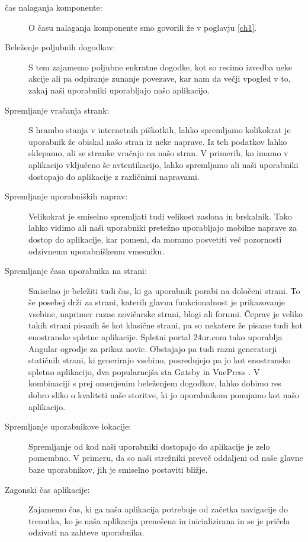 \documentclass[a4paper, 12pt]{book}
\begin{document}
\begin{description}
	\item[čas nalaganja komponente:] O času nalaganja komponente smo govorili že v poglavju \ref{ch1}.
	\item[Beleženje poljubnih dogodkov:] S tem zajamemo poljubne enkratne dogodke, kot so recimo izvedba neke akcije ali pa odpiranje zunanje povezave, kar nam da večji vpogled v to, zakaj naši uporabniki uporabljajo našo aplikacijo.
	\item[Spremljanje vračanja strank:] S hrambo stanja v internetnih piškotkih, lahko spremljamo kolikokrat je uporabnik že obiskal našo stran iz neke naprave. Iz teh podatkov lahko sklepamo,  ali se stranke vračajo na našo stran. V primerih, ko imamo v aplikacijo vključeno še avtentikacijo, lahko spremljamo ali naši uporabniki dostopajo do aplikacije z različnimi napravami.
	\item[Spremljanje uporabniških naprav:] Velikokrat je smiselno spremljati tudi velikost zaslona in brskalnik. Tako lahko vidimo ali naši uporabniki pretežno uporabljajo mobilne naprave za dostop do aplikacije, kar pomeni, da moramo posvetiti več pozornosti odzivnemu uporabniškemu vmesniku.
	\item[Spremljanje časa uporabnika na strani:] Smiselno je beležiti tudi čas, ki ga uporabnik porabi na določeni strani. To še posebej drži za strani, katerih glavna funkcionalnost je prikazovanje vsebine, naprimer razne novičarske strani, blogi ali forumi. Čeprav je veliko takih strani pisanih še kot klasične strani, pa so nekatere že pisane tudi kot enostranske spletne aplikacije. Spletni portal 24ur.com tako uporablja Angular ogrodje za prikaz novic. Obstajajo pa tudi razni generatorji statičnih strani, ki generirajo vsebino, posredujejo pa jo kot enostransko spletno aplikacijo, dva popularnejša sta Gatsby \cite{gatsby_website} in VuePress \cite{vuepress_website}. V kombinaciji s prej omenjenim beleženjem dogodkov, lahko dobimo res dobro sliko o kvaliteti naše storitve, ki jo uporabnikom ponujamo kot našo aplikacijo.
	\item[Spremljanje uporabnikove lokacije:] Spremljanje od kod naši uporabniki dostopajo do aplikacije je zelo pomembno. V primeru, da so naši strežniki preveč oddaljeni od naše glavne baze uporabnikov, jih je smiselno postaviti bližje.
	\item[Zagonski čas aplikacije:] Zajamemo čas, ki ga naša aplikacija potrebuje od začetka navigacije do trenutka, ko je naša aplikacija prenešena in inicializirana in se je pričela odzivati na zahteve uporabnika.

\end{description}
\end{document}
